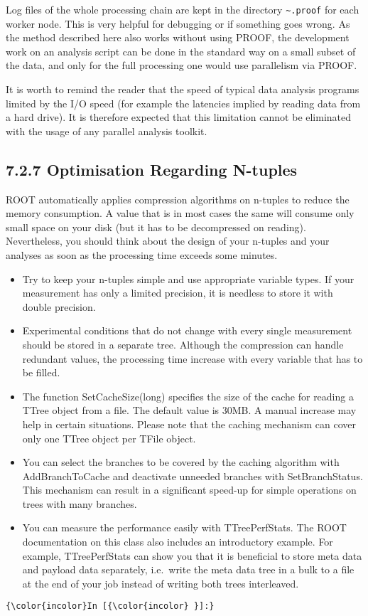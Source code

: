 \documentclass{article}
\begin{document}
Log files of the whole processing chain are kept in the directory
\texttt{\textasciitilde{}.proof} for each worker node. This is very
helpful for debugging or if something goes wrong. As the method
described here also works without using PROOF, the development work on
an analysis script can be done in the standard way on a small subset of
the data, and only for the full processing one would use parallelism via
PROOF.

It is worth to remind the reader that the speed of typical data analysis
programs limited by the I/O speed (for example the latencies implied by
reading data from a hard drive). It is therefore expected that this
limitation cannot be eliminated with the usage of any parallel analysis
toolkit.

\subsection{7.2.7 Optimisation Regarding
N-tuples}\label{optimisation-regarding-n-tuples}

ROOT automatically applies compression algorithms on n-tuples to reduce
the memory consumption. A value that is in most cases the same will
consume only small space on your disk (but it has to be decompressed on
reading). Nevertheless, you should think about the design of your
n-tuples and your analyses as soon as the processing time exceeds some
minutes.

\begin{itemize}
\item
  Try to keep your n-tuples simple and use appropriate variable types.
  If your measurement has only a limited precision, it is needless to
  store it with double precision.
\item
  Experimental conditions that do not change with every single
  measurement should be stored in a separate tree. Although the
  compression can handle redundant values, the processing time increase
  with every variable that has to be filled.
\item
  The function SetCacheSize(long) specifies the size of the cache for
  reading a TTree object from a file. The default value is 30MB. A
  manual increase may help in certain situations. Please note that the
  caching mechanism can cover only one TTree object per TFile object.
\item
  You can select the branches to be covered by the caching algorithm
  with AddBranchToCache and deactivate unneeded branches with
  SetBranchStatus. This mechanism can result in a significant speed-up
  for simple operations on trees with many branches.
\item
  You can measure the performance easily with TTreePerfStats. The ROOT
  documentation on this class also includes an introductory example. For
  example, TTreePerfStats can show you that it is beneficial to store
  meta data and payload data separately, i.e.~write the meta data tree
  in a bulk to a file at the end of your job instead of writing both
  trees interleaved.
\end{itemize}

    \begin{Verbatim}[commandchars=\\\{\}]
{\color{incolor}In [{\color{incolor} }]:} 
\end{Verbatim}


    
    
    
    
\end{document}
